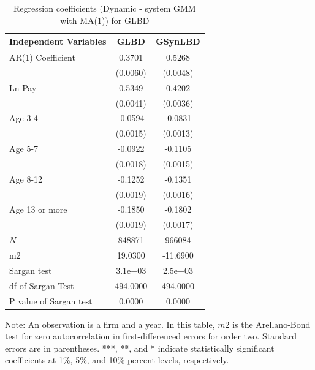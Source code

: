 \begin{table}[H]
  \centering
\caption{Regression coefficients (Dynamic - system GMM with MA(1)) for GLBD} \label{tab:Dynamic - system GMM with MA(1)_ger} \medskip
\renewcommand{\arraystretch}{1}
\setlength{\tabcolsep}{14pt}
\begin{tabular}{l|c| c}
\toprule
\textbf{Independent Variables}&\textbf{GLBD} &\textbf{GSynLBD}\\
\midrule
AR(1) Coefficient&   0.3701\sym{***}&   0.5268\sym{***}\\
          & (0.0060)         & (0.0048)         \\
[1em]
Ln Pay    &   0.5349\sym{***}&   0.4202\sym{***}\\
          & (0.0041)         & (0.0036)         \\
[1em]
Age 3-4   &  -0.0594\sym{***}&  -0.0831\sym{***}\\
          & (0.0015)         & (0.0013)         \\
[1em]
Age 5-7   &  -0.0922\sym{***}&  -0.1105\sym{***}\\
          & (0.0018)         & (0.0015)         \\
[1em]
Age 8-12  &  -0.1252\sym{***}&  -0.1351\sym{***}\\
          & (0.0019)         & (0.0016)         \\
[1em]
Age 13 or more&  -0.1850\sym{***}&  -0.1802\sym{***}\\
          & (0.0019)         & (0.0017)         \\
\hline
\(N\)     &   848871         &   966084         \\
m2        &  19.0300         & -11.6900         \\
Sargan test&  3.1e+03         &  2.5e+03         \\
df of Sargan Test& 494.0000         & 494.0000         \\
P value of Sargan test&   0.0000         &   0.0000         \\
    \bottomrule
  \end{tabular} 
\begin{tablenotes}
\small
\item Note: An observation is a firm and a year. In this table, $m2$ is the Arellano-Bond test for zero autocorrelation in first-differenced errors for order two. Standard errors are in parentheses. ***, **, and * indicate statistically significant coefficients at 1\%, 5\%, and 10\% percent levels, respectively.
 \end{tablenotes}
\end{table}
















